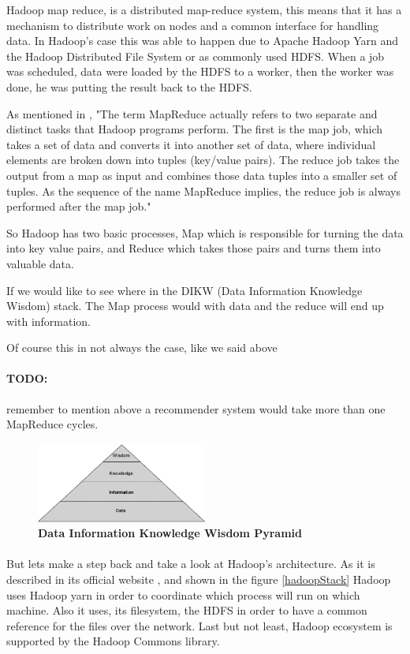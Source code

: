  Hadoop map reduce, is a distributed map-reduce system, 
this means that it has a mechanism to distribute work on nodes 
and a common interface for handling data. In Hadoop's case this was able to happen due to Apache Hadoop Yarn and the Hadoop Distributed File System or as commonly used HDFS.
 When a job was scheduled, data were loaded by the HDFS to a worker, 
then the worker was done, he was putting the result back to the HDFS. 

As mentioned in \cite{ibmMapReduce:5}, "The term MapReduce actually refers to two separate and distinct tasks that Hadoop programs perform. The first is the map job, which takes a set of data and converts it into another set of data, where individual elements are broken down into tuples (key/value pairs). The reduce job takes the output from a map as input and combines those data tuples into a smaller set of tuples. As the sequence of the name MapReduce implies, the reduce job is always performed after the map job."

So Hadoop has two basic processes, Map which is responsible for turning the data into key value pairs, and Reduce which takes those pairs and turns them into valuable data.

If we would like to see where in the DIKW (Data Information Knowledge Wisdom) stack. The Map process would with data and the reduce will end up with information.

Of course this in not always the case, like we said above 
\paragraph{TODO:} remember to mention above
a recommender system would take more than one MapReduce cycles.
 
\begin{figure}[h]
	\centering
	\includegraphics[width=0.5\textwidth]{images/DIKW.png}
	\caption{\bfseries Data Information Knowledge Wisdom Pyramid \cite{TheWisdomHierachy:7}}
	\label{dikw}
\end{figure}
\paragraph{} But lets make a step back and take a look at Hadoop's architecture. As it is described in its official website \cite{Hadoop:9}, and shown in the figure \ref{hadoopStack} Hadoop uses Hadoop yarn in order to coordinate which process will run on which machine. Also it uses, its filesystem, the HDFS in order to have a common reference for the files over the network. Last but not least, Hadoop ecosystem is supported by the Hadoop Commons library. 

